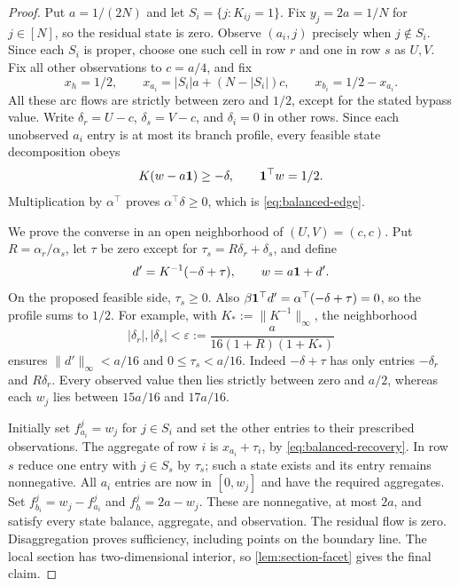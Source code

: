 \begin{proof}
Put $a=1/(2N)$ and let $S_i=\{j:K_{ij}=1\}$. Fix
$y_j=2a=1/N$ for $j\in[N]$, so the residual state is zero.
Observe $(a_i,j)$ precisely when $j\notin S_i$. Since each $S_i$
is proper, choose one such cell in row $r$ and one in row $s$ as
$U,V$. Fix all other observations to $c=a/4$, and fix
\begin{equation}\label{eq:balanced-aggregate}
 x_h=1/2,\qquad
 x_{a_i}=|S_i|a+(N-|S_i|)c,\qquad
 x_{b_i}=1/2-x_{a_i}.
\end{equation}
All these arc flows are strictly between zero and $1/2$, except for
the stated bypass value. Write $\delta_r=U-c$, $\delta_s=V-c$,
and $\delta_i=0$ in other rows. Since each unobserved $a_i$ entry
is at most its branch profile, every feasible state decomposition obeys
\[
 K(w-a\mathbf 1)\ge-\delta,\qquad \mathbf 1^\top w=1/2.
\]
Multiplication by $\alpha^\top$ proves
$\alpha^\top\delta\ge0$, which is \eqref{eq:balanced-edge}.

We prove the converse in an open neighborhood of $(U,V)=(c,c)$.
Put $R=\alpha_r/\alpha_s$, let $\tau$ be zero except for
$\tau_s=R\delta_r+\delta_s$, and define
\begin{equation}\label{eq:balanced-recovery}
 d'=K^{-1}(-\delta+\tau),\qquad w=a\mathbf 1+d'.
\end{equation}
On the proposed feasible side, $\tau_s\ge0$. Also
$\beta\mathbf 1^\top d'=\alpha^\top(-\delta+\tau)=0$,
so the profile sums to $1/2$.
For example, with $K_*:=\|K^{-1}\|_\infty$, the neighborhood
\[
 |\delta_r|,|\delta_s|<
 \varepsilon:=\frac{a}{16(1+R)(1+K_*)}
\]
ensures $\|d'\|_\infty<a/16$ and $0\le\tau_s<a/16$.
Indeed $-\delta+\tau$ has only entries $-\delta_r$ and
$R\delta_r$. Every observed value then lies strictly between zero
and $a/2$, whereas each $w_j$ lies between $15a/16$ and $17a/16$.

Initially set $f^j_{a_i}=w_j$ for $j\in S_i$ and set the other
entries to their prescribed observations. The aggregate of row $i$
is $x_{a_i}+\tau_i$, by \eqref{eq:balanced-recovery}.
In row $s$ reduce one entry with $j\in S_s$ by $\tau_s$;
such a state exists and its entry remains nonnegative. All $a_i$
entries are now in $[0,w_j]$ and have the required aggregates.
Set $f^j_{b_i}=w_j-f^j_{a_i}$ and $f^j_h=2a-w_j$.
These are nonnegative, at most $2a$, and satisfy every state balance,
aggregate, and observation. The residual flow is zero. Disaggregation
proves sufficiency, including points on the boundary line. The local
section has two-dimensional interior, so \cref{lem:section-facet}
gives the final claim.
\end{proof}

